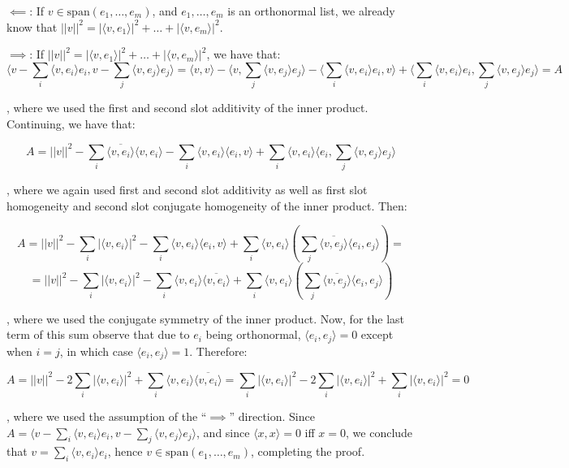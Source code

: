 \begin{solution}
    
    $\impliedby$: If $v \in \text{span}(e_1, \ldots, e_m)$, and $e_1, \ldots, e_m$ is an orthonormal list, we already know that $\lvert \lvert v \rvert \rvert^2 = \lvert \langle v, e_1 \rangle \rvert^2 + \ldots + \lvert \langle v, e_m \rangle \rvert^2$.
    
    $\implies$: If $\lvert \lvert v \rvert \rvert^2 = \lvert \langle v, e_1 \rangle \rvert^2 + \ldots + \lvert \langle v, e_m \rangle \rvert^2$, we have that:
    $$ \langle v - \sum_{i} \langle v, e_i \rangle e_i, v - \sum_{j} \langle v, e_j \rangle e_j \rangle = \langle v, v \rangle - \langle v, \sum_{j} \langle v, e_j \rangle e_j \rangle - \langle \sum_{i} \langle v, e_i \rangle e_i, v \rangle + \langle \sum_{i} \langle v, e_i \rangle e_i, \sum_{j} \langle v, e_j \rangle e_j \rangle = A$$

    , where we used the first and second slot additivity of the inner product. Continuing, we have that:

    $$A = \lvert \lvert v \rvert \rvert^2 - \sum_{i} \overline{\langle v, e_i \rangle}\langle v, e_i \rangle - \sum_{i} \langle v, e_i \rangle \langle e_i, v \rangle + \sum_{i} \langle v, e_i \rangle \langle e_i, \sum_{j} \langle v, e_j \rangle e_j \rangle$$

    , where we again used first and second slot additivity as well as first slot homogeneity and second slot conjugate homogeneity of the inner product. Then:

    $$A = \lvert \lvert v \rvert \rvert^2 - \sum_{i} \lvert \langle v, e_i \rangle \rvert^2 - \sum_{i} \langle v, e_i \rangle \langle e_i, v \rangle + \sum_{i}\langle v, e_i \rangle (\sum_{j}\overline{\langle v, e_j \rangle} \langle e_i, e_j \rangle) = $$
    $$ = \lvert \lvert v \rvert \rvert^2 - \sum_{i} \lvert \langle v, e_i \rangle \rvert^2 - \sum_{i} \langle v, e_i \rangle \overline{\langle v, e_i \rangle} + \sum_{i}\langle v, e_i \rangle (\sum_{j}\overline{\langle v, e_j \rangle} \langle e_i, e_j \rangle) $$

    , where we used the conjugate symmetry of the inner product. Now, for the last term of this sum observe that due to $e_i$ being orthonormal, $\langle e_i, e_j \rangle = 0$ except when $i = j$, in which case $\langle e_i, e_j \rangle = 1$. Therefore:

    $$A = \lvert \lvert v \rvert \rvert^2 - 2\sum_{i} \lvert \langle v, e_i \rangle \rvert^2 + \sum_{i} \langle v, e_i \rangle \overline{\langle v, e_i \rangle} = \sum_{i} \lvert \langle v, e_i \rangle \rvert^2 - 2 \sum_{i} \lvert \langle v, e_i \rangle \rvert^2 + \sum_{i} \lvert \langle v, e_i \rangle \rvert^2 = 0$$

    , where we used the assumption of the ``$\implies$'' direction. Since $A = \langle v - \sum_{i} \langle v, e_i \rangle e_i, v - \sum_{j} \langle v, e_j \rangle e_j \rangle$, and since $\langle x, x \rangle = 0$ iff $x = 0$, we conclude that $v = \sum_{i} \langle v, e_i \rangle e_i$, hence $v \in \text{span}(e_1, \ldots, e_m)$, completing the proof.
\end{solution}


